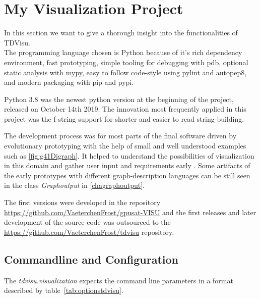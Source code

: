 \documentclass[a4paper, 12pt, bibliography=totoc]{scrartcl}
\begin{document}
\newpage
\section{My Visualization Project}\label{sec:project}

In this section we want to give a thorough insight into the functionalities of TDVisu.\\

The programming language chosen is Python because of it's rich dependency environment, fast prototyping, simple tooling for debugging with pdb, optional static analysis with mypy, easy to follow code-style using pylint and autopep8, and modern packaging with pip and pypi.

Python 3.8 was the newest python version at the beginning of the project, released on October 14th 2019. The innovation most frequently applied in this project was the f-string support for shorter and easier to read string-building. %

The development process was for most parts of the final software driven by evolutionary prototyping with the help of small and well understood examples such as \ref{fig:g41Digraph}. It helped to understand the possibilities of visualization in this domain and gather user input and requirements early \cite{rapidPrototypingOvermyer}. Some artifacts of the early prototypes with different graph-description languages can be still seen in the class \textit{Graphoutput} in \ref{chagraphoutput}.

The first versions were developed in the repository \url{https://github.com/VaeterchenFrost/gpusat-VISU} and the first releases and later development of the source code was outsourced to the \url{https://github.com/VaeterchenFrost/tdvisu} repository.


\subsection{Commandline and Configuration}

The \textit{tdvisu.visualization} expects the command line parameters in a format described by table~\ref{tab:optionstdvisu}.
\end{document}
